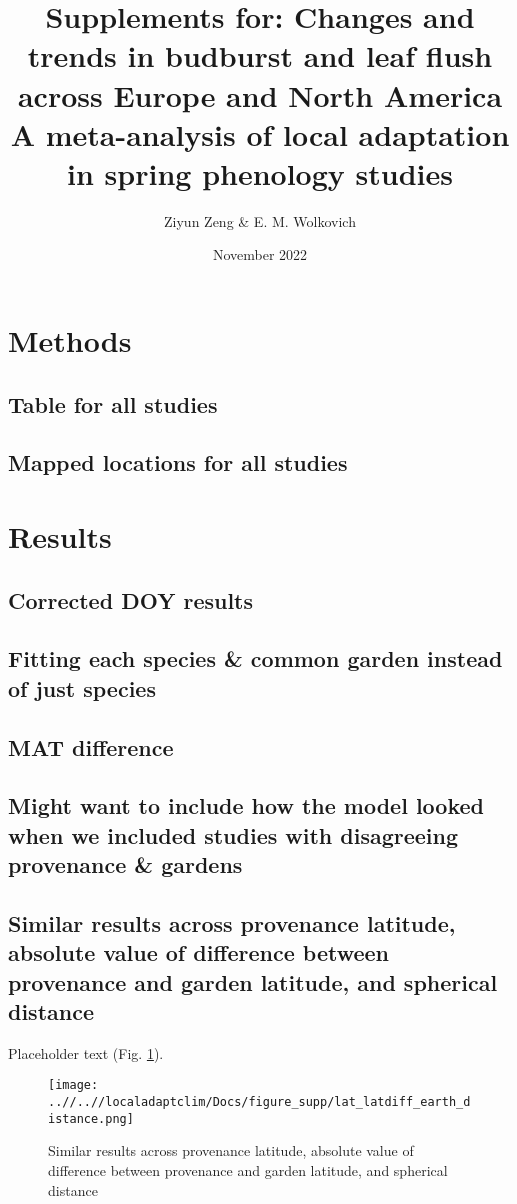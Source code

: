 \documentclass{article}
\begin{document}
\title{{\huge Supplements for: Changes and trends in budburst and leaf flush across Europe and North America} \\A meta-analysis of local adaptation in spring phenology studies}
\author{Ziyun Zeng \& E. M. Wolkovich}
\date{November 2022}
\maketitle 


\section*{Methods}
\subsection*{Table for all studies}
\subsection*{Mapped locations for all studies}

\section*{Results}




\subsection*{Corrected DOY results}
\subsection*{Fitting each species \& common garden instead of just species}
\subsection*{MAT difference}
\subsection*{Might want to include how the model looked when we included studies with disagreeing provenance \& gardens}


\subsection*{Similar results across provenance latitude, absolute value of difference between provenance and garden latitude, and spherical distance}
Placeholder text (Fig. \ref{figure:lat_distance}).
\begin{figure}[!h] 
    \centering
 \texttt{[image: ..//..//localadaptclim/Docs/figure\_supp/lat\_latdiff\_earth\_distance.png]}
    \caption{Similar results across provenance latitude, absolute value of difference between provenance and garden latitude, and spherical distance}
    \label{figure:lat_distance}
\end{figure}
\end{document}
